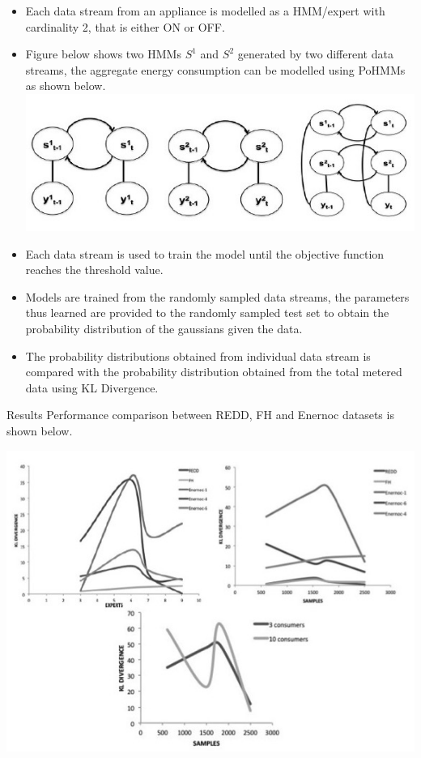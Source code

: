 \documentclass{beamer}
\begin{document}
\begin{frame}
\begin{itemize}
\item Each data stream from an appliance is modelled as a HMM/expert with cardinality 2, that is either ON or OFF. 
\item Figure below shows two HMMs $S^1$ and $S^2$ generated by two different data streams, the aggregate energy consumption can be modelled using PoHMMs as shown below.
\includegraphics[height=0.7 in]{images/pohmm.jpg}
\item Each data stream is used to train the model until the objective function reaches the threshold value. 
\item Models are trained from the randomly sampled data streams, the parameters thus learned are provided to the randomly sampled test set to obtain the probability distribution of the gaussians given the data.
\item The probability distributions obtained from individual data stream is compared with the probability distribution obtained from the total metered data using KL Divergence.
\end{itemize}
\end{frame}

\begin{frame}{Results}
Performance comparison between REDD, FH and Enernoc datasets is shown below.
\begin{center}
\includegraphics[height=2.5 in]{images/pohmm_res.jpg}
\end{center}
\end{frame}
\end{document}
